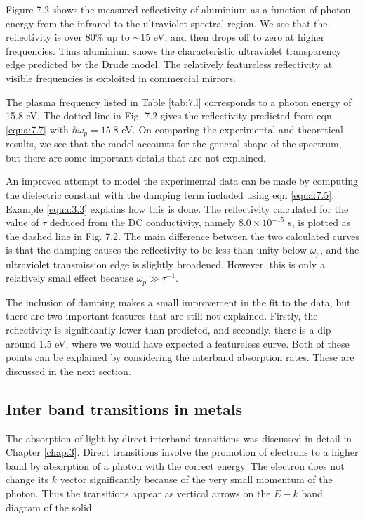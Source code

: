 \documentclass[12pt]{book}
\begin{document}
Figure 7.2 shows the measured reflectivity of aluminium as a function of photon energy from the infrared to the ultraviolet spectral region. We see that the reflectivity is over $80\%$ up to $\sim15$ eV, and then drops off to zero at higher frequencies. Thus aluminium shows the characteristic ultraviolet transparency edge predicted by the Drude model. The relatively featureless reflectivity at visible frequencies is exploited in commercial mirrors.

The plasma frequency listed in Table \ref{tab:7.l} corresponds to a photon energy of 15.8 eV. The dotted line in Fig. 7.2 gives the reflectivity predicted from eqn \ref{equa:7.7} with $\hbar\omega_p = 15.8$ eV. On comparing the experimental and theoretical results, we see that the model accounts for the general shape of the spectrum, but there are some important details that are not explained.

An improved attempt to model the experimental data can be made by computing the dielectric constant with the damping term included using eqn \ref{equa:7.5}. Example \ref{equa:3.3} explains how this is done. The reflectivity calculated for the value of $\tau$ deduced from the DC conductivity, namely $8.0 \times10^{-15}$ s, is plotted as the dashed line in Fig. 7.2. The main difference between the two calculated curves is that the damping causes the reflectivity to be less than unity below $\omega_p$, and the ultraviolet transmission edge is slightly broadened. However, this is only a relatively small effect because $\omega_p\gg\tau^{-1}$.

The inclusion of damping makes a small improvement in the fit to the data, but there are two important features that are still not explained. Firstly, the reflectivity is significantly lower than predicted, and secondly, there is a dip around 1.5 eV, where we would have expected a featureless curve. Both of these points can be explained by considering the interband absorption rates. These are discussed in the next section.

\subsection{Inter band transitions in metals}
The absorption of light by direct interband transitions was discussed in detail in Chapter \ref{chap:3}. Direct transitions involve the promotion of electrons to a higher band by absorption of a photon with the correct energy. The electron does not change its $k$ vector significantly because of the very small momentum of the photon. Thus the transitions appear as vertical arrows on the $E-k$ band diagram of the solid.
\end{document}

